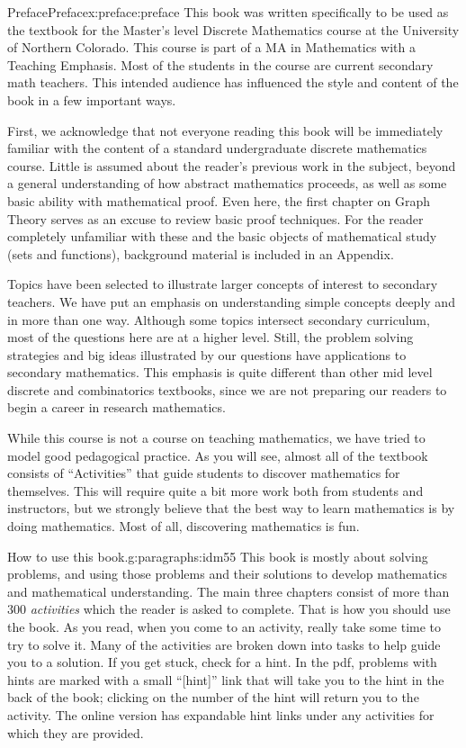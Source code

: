 \documentclass[oneside,10pt,]{book}
\numberwithin{equation}{chapter}
\begin{document}
\begin{preface}{Preface}{}{Preface}{}{}{x:preface:preface}
This book was written specifically to be used as the textbook for the Master's level Discrete Mathematics course at the University of Northern Colorado.  This course is part of a MA in Mathematics with a Teaching Emphasis.  Most of the students in the course are current secondary math teachers.  This intended audience has influenced the style and content of the book in a few important ways.%
\par
First, we acknowledge that not everyone reading this book will be immediately familiar with the content of a standard undergraduate discrete mathematics course.  Little is assumed about the reader's previous work in the subject, beyond a general understanding of how abstract mathematics proceeds, as well as some basic ability with mathematical proof. Even here, the first chapter on Graph Theory serves as an excuse to review basic proof techniques.  For the reader completely unfamiliar with these and the basic objects of mathematical study (sets and functions), background material is included in an Appendix.%
\par
Topics have been selected to illustrate larger concepts of interest to secondary teachers.  We have put an emphasis on understanding simple concepts deeply and in more than one way.  Although some topics intersect secondary curriculum, most of the questions here are at a higher level.  Still, the problem solving strategies and big ideas illustrated by our questions have applications to secondary mathematics.  This emphasis is quite different than other mid level discrete and combinatorics textbooks, since we are not preparing our readers to begin a career in research mathematics.%
\par
While this course is not a course on teaching mathematics, we have tried to model good pedagogical practice.  As you will see, almost all of the textbook consists of ``Activities'' that guide students to discover mathematics for themselves.  This will require quite a bit more work both from students and instructors, but we strongly believe that the best way to learn mathematics is by doing mathematics.  Most of all, discovering mathematics is fun.%
\begin{paragraphs}{How to use this book.}{g:paragraphs:idm55}%
This book is mostly about solving problems, and using those problems and their solutions to develop mathematics and mathematical understanding.  The main three chapters consist of more than 300 \emph{activities} which the reader is asked to complete.  That is how you should use the book.  As you read, when you come to an activity, really take some time to try to solve it.  Many of the activities are broken down into tasks to help guide you to a solution.  If you get stuck, check for a hint.  In the pdf, problems with hints are marked with a small ``[hint]'' link that will take you to the hint in the back of the book; clicking on the number of the hint will return you to the activity.  The online version has expandable hint links under any activities for which they are provided.%

\end{paragraphs}
\end{preface}
\end{document}
